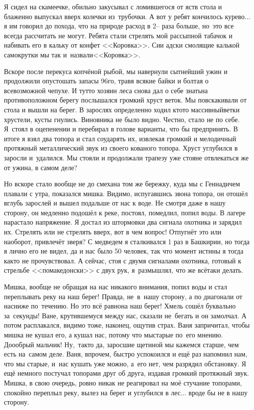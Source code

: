 Я сидел на скамеечке, обильно закусывал с ломившегося от яств стола и блаженно выпускал вверх колечки из~трубочки. А вот у ребят кончилось курево$\ldots$ я им говорил до похода, что на природе расход в 2\thinspace\nobreakdash-- раза больше, но~это все всегда рассчитать не могут. Ребята стали стрелять мой рассыпной табачок и набивать его в кальку от конфет <<Коровка>>. Сии адски смолящие калькой самокрутки мы так и~назвали\mdash <<Коровка>>. 

Вскоре после перекуса копчёной рыбой, мы навернули сытнейший ужин и продолжили опустошать запасы 96\sdash го, травя всякие байки и болтая о всевозможной чепухе. И тут\sdash то хозяин леса снова дал о себе знать\mdash на противоположном берегу послышался громкий хруст веток. Мы повскакивали от стола и вышли на берег. В зарослях определенно ходил кто\sdash то массивный\mdash ветки хрустели, кусты гнулись. Виновника не было видно. Честно, стало не по себе. Я~стоял в оцепенении и перебирал в голове варианты, что бы предпринять. В итоге я взял два топора и стал соударять их, извлекая громкий и мелодичный протяжный металлический звук из своего кованого топора. Хруст углубился в заросли и~удалился. Мы стояли и продолжали трапезу уже стоя\mdash не отвлекаться же от ужина, в самом деле? 

Но вскоре стало вообще не до смеха\mdash на том же бережку, куда мы с Геннадичем плавали с утра, показался мишка. Видимо, испугавшись звона топора, он отошёл вглубь зарослей и вышел подальше от нас к воде. Не смотря даже в нашу сторону, он медленно подошёл к реке, постоял, помедлил, попил воды. В лагере нарастало напряжение. Я достал из штормовки два сигнала охотника и зарядил их. Стрелять или не стрелять вверх, вот в чем вопрос! Отпугнёт это или наоборот, привлечёт зверя? С медведем я сталкивался 1 раз в Башкирии, но тогда я лично его не видел, да и нас было 50 человек, так что момент истины я тогда как\sdash то не прочувствовал. А сейчас, стоя с двумя сигналами охотника, готовый к стрельбе <<по\sdash македонски>> с двух рук, я~размышлял, что же всё\sdash таки делать. 

Мишка, вообще не обращая на нас никакого внимания, попил воды и стал переплывать реку на наш берег! Правда, не~в~нашу сторону, а по диагонали от нас\mdash ниже по~течению. Но это всё равно\mdash на наш берег! Хмель сошёл буквально за~секунды! Ване, крутившемуся между нас, сказали не~бегать и он замолчал. А потом расплакался, видимо тоже, наконец, ощутив страх. Ваня запричитал, чтобы мишка не кушал его, а кушал нас, потому что мы\mdash старые по~его мнению. До\sdash о\sdash о\sdash брый мальчик! Ну,~так\sdash то да, заросшие щетиной мы кажемся старше, чем есть на~самом деле. Ваня, впрочем, быстро успокоился и ещё раз напомнил нам, что мы старые, и~нас кушать уже можно, а~его нет, чем разрядил обстановку. Я ещё немного постучал топорами друг об друга, издавая громкий протяжный звук. Мишка, в свою очередь, ровно никак не реагировал на моё стучание топорами, спокойно переплыл реку, вылез на берег и углубился в лес$\ldots$ вроде бы не в нашу сторону.


